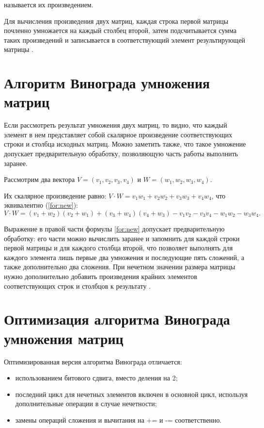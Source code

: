 называется их произведением.

Для вычисления произведения двух матриц, каждая строка первой матрицы почленно умножается на каждый столбец второй, затем подсчитывается сумма таких произведений и записывается в соответствующий элемент результирующей матрицы \cite{alg}.

\section{Алгоритм Винограда умножения матриц}

Если рассмотреть результат умножения двух матриц, то видно, что каждый элемент в нем представляет собой скалярное произведение соответствующих строки и столбца исходных матриц. Можно заметить также, что такое умножение допускает предварительную обработку, позволяющую часть работы выполнить заранее.

Рассмотрим два вектора $V = (v_1, v_2, v_3, v_4)$ и $W = (w_1, w_2, w_3, w_4)$.

Их скалярное произведение равно: $V \cdot W = v_1w_1 + v_2w_2 + v_3w_3 + v_4w_4$, что эквивалентно (\ref{for:new}):
\begin{equation}
	\label{for:new}
	V \cdot W = (v_1 + w_2)(v_2 + w_1) + (v_3 + w_4)(v_4 + w_3) - v_1v_2 - v_3v_4 - w_1w_2 - w_3w_4.
\end{equation}

Выражение в правой части формулы \ref{for:new} допускает предварительную обработку: его части можно вычислить заранее и запомнить для каждой строки первой матрицы и для каждого
столбца второй, что позволяет выполнять для каждого элемента лишь первые два умножения и последующие пять сложений, а также дополнительно два сложения. При нечетном значении размера матрицы нужно дополнительно добавить произведения крайних элементов соответствующих строк и столбцов к результату \cite{alg}.

\section{Оптимизация алгоритма Винограда умножения матриц}

Оптимизированная версия алгоритма Винограда \cite{alg} отличается:

\begin{itemize}
	\item использованием битового сдвига, вместо деления на 2;
	\item последний цикл для нечетных элементов включен в основной цикл, используя дополнительные операции в случае нечетности;
	\item замены операций сложения и вычитания на += и -= соответственно.
\end{itemize}

